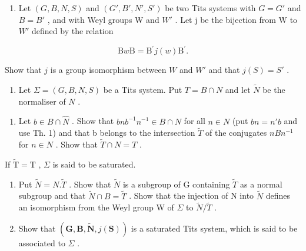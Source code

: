 \begin{enumerate}
\def\labelenumi{\arabic{enumi})}
\setcounter{enumi}{3}
\tightlist
\item
  Let \((G, B, N, S)\) and \((G', B', N', S')\) be two Tits systems with \(G = G'\) and \(B = B'\) , and with Weyl groups W and \(W'\) . Let j be the bijection from W to \(W'\) defined by the relation
\end{enumerate}

\[
\mathrm{B} w \mathrm{B} = \mathrm{B} ^ {\prime} j (w) \mathrm{B} ^ {\prime}.
\]

Show that \(j\) is a group isomorphism between \(W\) and \(W'\) and that \(j(S) = S'\) .

\begin{enumerate}
\def\labelenumi{\arabic{enumi})}
\setcounter{enumi}{4}
\tightlist
\item
  Let \(\Sigma = (G, B, N, S)\) be a Tits system. Put \(T = B \cap N\) and let \(\tilde{N}\) be the normaliser of \(N\) .
\end{enumerate}

\begin{enumerate}
\def\labelenumi{\alph{enumi})}
\tightlist
\item
  Let \(b \in B \cap \hat{N}\) . Show that \(bnb^{-1}n^{-1} \in B \cap N\) for all \(n \in N\) (put \(bn = n'b\) and use Th. 1) and that b belongs to the intersection \(\tilde{T}\) of the conjugates \(nBn^{-1}\) for \(n \in N\) . Show that \(\tilde{T} \cap N = T\) .
\end{enumerate}

If \(\tilde{\mathrm{T}} = \mathrm{T}\) , \(\Sigma\) is said to be saturated.

\begin{enumerate}
\def\labelenumi{\alph{enumi})}
\setcounter{enumi}{1}
\item
  Put \(\tilde{N} = N.\tilde{T}\) . Show that \(\tilde{N}\) is a subgroup of G containing \(\tilde{T}\) as a normal subgroup and that \(\tilde{N} \cap B = \tilde{T}\) . Show that the injection of N into \(\tilde{N}\) defines an isomorphism from the Weyl group W of \(\Sigma\) to \(\tilde{N}/\tilde{T}\) .
\item
  Show that \((\mathbf{G},\mathbf{B},\tilde{\mathbf{N}},j(\mathbf{S}))\) is a saturated Tits system, which is said to be associated to \(\Sigma\) .
\end{enumerate}

